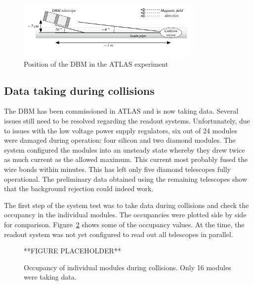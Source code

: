 \documentclass[twoside,12pt]{packages/mytustyle}  %
\begin{document}
\begin{figure}[!t]
\centering
\includegraphics[width=0.8\textwidth]{../../scripts/04_charge_monitoring/plots/DBM-positioning}
\caption{Position of the DBM in the ATLAS experiment}
\label{fig:dbminatlas}
\end{figure}



\subsection{Data taking during collisions}
The DBM has been commissioned in ATLAS and is now taking data. Several issues still need to be resolved regarding the readout systems. Unfortunately, due to issues with the low voltage power supply regulators, six out of 24 modules were damaged during operation: four silicon and two diamond modules. The system configured the modules into an unsteady state whereby they drew twice as much current as the allowed maximum. This current most probably fused the wire bonds within minutes. This has left only five diamond telescopes fully operational. The preliminary data obtained using the remaining telescopes show that the background rejection could indeed work. 

The first step of the system test was to take data during collisions and check the occupancy in the individual modules. The occupancies were plotted side by side for comparison. Figure~\ref{fig:collocc} shows some of the occupancy values. At the time, the readout system was not yet configured to read out all telescopes in parallel. 
\begin{figure}[!t]
\centering
**FIGURE PLACEHOLDER**
\caption{Occupancy of individual modules during collisions. Only 16 modules were taking data.}
\label{fig:collocc}
\end{figure}
\end{document}
